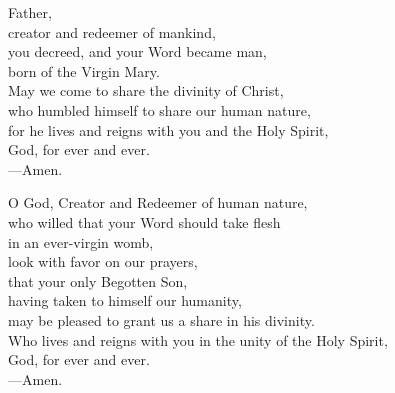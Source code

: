 \prayer


\begin{prayerverse}
Father,\\
creator and redeemer of mankind,\\
you decreed, and your Word became man,\\
born of the Virgin Mary.\\
May we come to share the divinity of Christ,\\
who humbled himself to share our human nature,\\
for he lives and reigns with you and the Holy Spirit,\\
God, for ever and ever. \\
{\color{red}---\thinspace}Amen.
\end{prayerverse}


\begin{prayerverse}
O God, Creator and Redeemer of human nature,\\
who willed that your Word should take flesh\\
in an ever-virgin womb,\\
look with favor on our prayers,\\
that your only Begotten Son,\\
 having taken to himself our humanity,\\
may be pleased to grant us a share in his divinity.\\
Who lives and reigns with you in the unity of the Holy Spirit,\\
God, for ever and ever.\\
{\color{red}---\thinspace}Amen.

\end{prayerverse}

